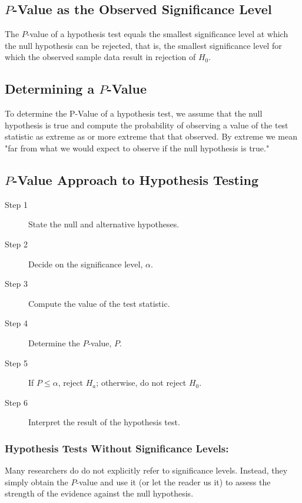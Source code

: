 \documentclass[12pt]{article}
\begin{document}
        \subsection*{$P$-Value as the Observed Significance Level}
            The $P$-value of a hypothesis test equals the smallest significance level at which
            the null hypothesis can be rejected, that is, the smallest significance level for
            which the observed sample data result in rejection of $H_0$.
        \subsection*{Determining a $P$-Value}
            To determine the P-Value of a hypothesis test, we assume that the null hypothesis
            is true and compute the probability of observing a value of the test statistic as
            extreme as or more extreme that that observed. By extreme we mean "far from what
            we would expect to observe if the null hypothesis is true."
        \subsection*{$P$-Value Approach to Hypothesis Testing}
            \begin{description}
                \item[Step 1] State the null and alternative hypotheses.
                \item[Step 2] Decide on the significance level, $\alpha$. 
                \item[Step 3] Compute the value of the test statistic.
                \item[Step 4] Determine the $P$-value, $P$.
                \item[Step 5] If $P \leq \alpha$, reject $H_a$; otherwise, do not reject $H_0$.
                \item[Step 6] Interpret the result of the hypothesis test.    
            \end{description}
            \subsubsection*{Hypothesis Tests Without Significance Levels:} Many researchers do
            do not explicitly refer to significance levels. Instead, they simply obtain the
            $P$-value and use it (or let the reader us it) to assess the strength of the
            evidence against the null hypothesis.
    
\end{document}
